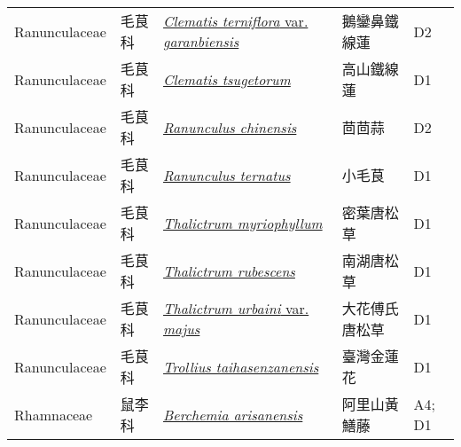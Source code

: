 {\begin{longtable}{p{2.5cm}p{2.5cm}p{4.5cm}p{2.5cm}p{3cm}}
    Ranunculaceae & 毛茛科 & \href{http://www.theplantlist.org/tpl1.1/search?q=Clematis+terniflora+var.+garanbiensis}{\textit{Clematis terniflora} var. \textit{garanbiensis} } & 鵝鑾鼻鐵線蓮 & D2 \index{Clematis@\textit{Clematis}!terniflora@\textit{terniflora}!var. garanbiensis@var. \textit{garanbiensis}}  \index{鵝鑾鼻鐵線蓮} \\
    Ranunculaceae & 毛茛科 & \href{http://www.theplantlist.org/tpl1.1/search?q=Clematis+tsugetorum}{\textit{Clematis tsugetorum} } & 高山鐵線蓮 & D1 \index{Clematis@\textit{Clematis}!tsugetorum@\textit{tsugetorum}}  \index{高山鐵線蓮} \\
    Ranunculaceae & 毛茛科 & \href{http://www.theplantlist.org/tpl1.1/search?q=Ranunculus+chinensis}{\textit{Ranunculus chinensis} } & 茴茴蒜 & D2 \index{Ranunculus@\textit{Ranunculus}!chinensis@\textit{chinensis}}  \index{茴茴蒜} \\
    Ranunculaceae & 毛茛科 & \href{http://www.theplantlist.org/tpl1.1/search?q=Ranunculus+ternatus}{\textit{Ranunculus ternatus} } & 小毛茛 & D1 \index{Ranunculus@\textit{Ranunculus}!ternatus@\textit{ternatus}}  \index{小毛茛} \\
    Ranunculaceae & 毛茛科 & \href{http://www.theplantlist.org/tpl1.1/search?q=Thalictrum+myriophyllum}{\textit{Thalictrum myriophyllum} } & 密葉唐松草 & D1 \index{Thalictrum@\textit{Thalictrum}!myriophyllum@\textit{myriophyllum}}  \index{密葉唐松草} \\
    Ranunculaceae & 毛茛科 & \href{http://www.theplantlist.org/tpl1.1/search?q=Thalictrum+rubescens}{\textit{Thalictrum rubescens} } & 南湖唐松草 & D1 \index{Thalictrum@\textit{Thalictrum}!rubescens@\textit{rubescens}}  \index{南湖唐松草} \\
    Ranunculaceae & 毛茛科 & \href{http://www.theplantlist.org/tpl1.1/search?q=Thalictrum+urbaini+var.+majus}{\textit{Thalictrum urbaini} var. \textit{majus} } & 大花傅氏唐松草 & D1 \index{Thalictrum@\textit{Thalictrum}!urbaini@\textit{urbaini}!var. majus@var. \textit{majus}}  \index{大花傅氏唐松草} \\
    Ranunculaceae & 毛茛科 & \href{http://www.theplantlist.org/tpl1.1/search?q=Trollius+taihasenzanensis}{\textit{Trollius taihasenzanensis} } & 臺灣金蓮花 & D1 \index{Trollius@\textit{Trollius}!taihasenzanensis@\textit{taihasenzanensis}}  \index{臺灣金蓮花} \\
    Rhamnaceae & 鼠李科 & \href{http://www.theplantlist.org/tpl1.1/search?q=Berchemia+arisanensis}{\textit{Berchemia arisanensis} } & 阿里山黃鱔藤 & A4; D1 \index{Berchemia@\textit{Berchemia}!arisanensis@\textit{arisanensis}}  \index{阿里山黃鱔藤} \\

\end{longtable}}
